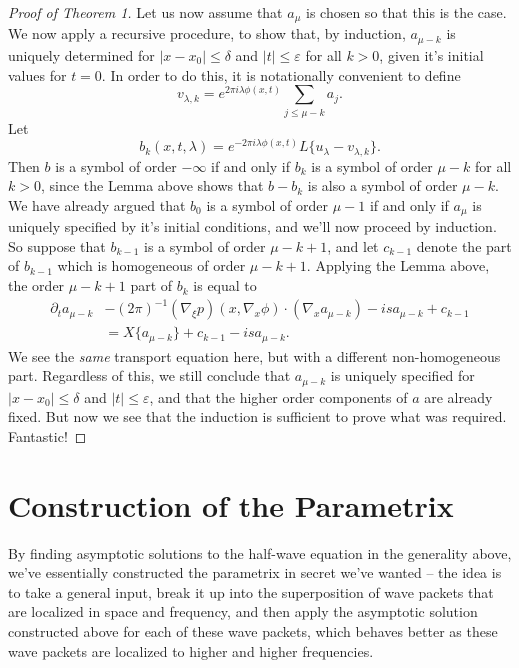 \documentclass{article}
\theoremstyle{plain}
\theoremstyle{remark}
\theoremstyle{definition}
\begin{document}
\begin{proof}[Proof of Theorem 1]
Let us now assume that $a_\mu$ is chosen so that this is the case. We now apply a recursive procedure, to show that, by induction, $a_{\mu - k}$ is uniquely determined for $|x - x_0| \leq \delta$ and $|t| \leq \varepsilon$ for all $k > 0$, given it's initial values for $t = 0$. In order to do this, it is notationally convenient to define
%
\[ v_{\lambda, k} = e^{2 \pi i \lambda \phi(x,t)} \sum_{j \leq \mu - k} a_j. \]
%
Let
%
\[ b_k(x,t,\lambda) = e^{-2 \pi i \lambda \phi(x,t)} L \{ u_\lambda - v_{\lambda,k} \}. \]
%
Then $b$ is a symbol of order $-\infty$ if and only if $b_k$ is a symbol of order $\mu - k$ for all $k > 0$, since the Lemma above shows that $b - b_k$ is also a symbol of order $\mu - k$. We have already argued that $b_0$ is a symbol of order $\mu - 1$ if and only if $a_\mu$ is uniquely specified by it's initial conditions, and we'll now proceed by induction. So suppose that $b_{k-1}$ is a symbol of order $\mu - k + 1$, and let $c_{k-1}$ denote the part of $b_{k-1}$ which is homogeneous of order $\mu - k + 1$. Applying the Lemma above, the order $\mu - k + 1$ part of $b_k$ is equal to
%
\begin{align*}
	\partial_t a_{\mu - k} &- (2\pi)^{-1} (\nabla_\xi p)(x, \nabla_x \phi) \cdot (\nabla_x a_{\mu - k}) - i s a_{\mu-k} + c_{k-1}\\
	&= X \{ a_{\mu - k} \} + c_{k-1} - i s a_{\mu - k}.
\end{align*}
%
We see the \emph{same} transport equation here, but with a different non-homogeneous part. Regardless of this, we still conclude that $a_{\mu - k}$ is uniquely specified for $|x - x_0| \leq \delta$ and $|t| \leq \varepsilon$, and that the higher order components of $a$ are already fixed. But now we see that the induction is sufficient to prove what was required. Fantastic! \qedhere

\end{proof}

\section{Construction of the Parametrix}

By finding asymptotic solutions to the half-wave equation in the generality above, we've essentially constructed the parametrix in secret we've wanted -- the idea is to take a general input, break it up into the superposition of wave packets that are localized in space and frequency, and then apply the asymptotic solution constructed above for each of these wave packets, which behaves better as these wave packets are localized to higher and higher frequencies.
\end{document}

